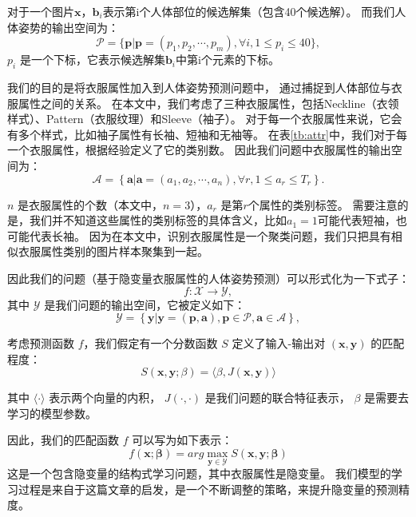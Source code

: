 对于一个图片$\mathbf{x}$，$\mathbf{b}_i$表示第i个人体部位的候选解集（包含40个候选解）。
而我们人体姿势的输出空间为：
\begin{equation}
    \mathcal{P} = \{\mathbf{p}| \mathbf{p}=(p_1,p_2,\cdots,p_m), \forall i, 1\leq p_i \leq 40\},
\end{equation}
$p_i$ 是一个下标，它表示候选解集$\mathbf{b}_i$中第i个元素的下标。

我们的目的是将衣服属性加入到人体姿势预测问题中，
通过捕捉到人体部位与衣服属性之间的关系。
在本文中，我们考虑了三种衣服属性，包括Neckline（衣领样式）、Pattern（衣服纹理）和Sleeve（袖子）。
对于每一个衣服属性来说，它会有多个样式，比如袖子属性有长袖、短袖和无袖等。
在表\ref{tb:attr}中，我们对于每一个衣服属性，根据经验定义了它的类别数。
因此我们问题中衣服属性的输出空间为：
\begin{equation}
    \mathcal{A} = \left\{ \mathbf{a}|\mathbf{a} = (a_1, a_2, \cdots, a_n), \forall r, 1 \leq a_r \leq T_r \right\}.
\end{equation}

$n$ 是衣服属性的个数（本文中，$n = 3$），$a_r$ 是第$r$个属性的类别标签。
需要注意的是，我们并不知道这些属性的类别标签的具体含义，比如$a_1 = 1$可能代表短袖，也可能代表长袖。
因为在本文中，识别衣服属性是一个聚类问题，我们只把具有相似衣服属性类别的图片样本聚集到一起。

因此我们的问题（基于隐变量衣服属性的人体姿势预测）可以形式化为一下式子：
\begin{equation}
    f: \mathcal{X} \rightarrow \mathcal{Y},
    \label{eq:task_func}
\end{equation}
其中 $\mathcal{Y}$ 是我们问题的输出空间，它被定义如下：
\begin{equation}
    \mathcal{Y} = \left\{ \mathbf{y}|\mathbf{y} = (\mathbf{p},\mathbf{a}), \mathbf{p} \in \mathcal{P}, \mathbf{a} \in \mathcal{A} \right\},
\end{equation}

考虑预测函数 $f$，我们假定有一个分数函数 $S$ 定义了输入-输出对 $(\mathbf{x}, \mathbf{y})$ 的匹配程度：
\begin{equation}
\label{eq:map}
    S(\mathbf{x}, \mathbf{y};\beta) = \langle \beta, J(\mathbf{x}, \mathbf{y}) \rangle
\end{equation}

其中 $\langle \cdot \rangle$ 表示两个向量的内积，
$J(\cdot, \cdot)$ 是我们问题的联合特征表示，
$\beta$ 是需要去学习的模型参数。

因此，我们的匹配函数 $f$ 可以写为如下表示：
\begin{equation}
    f(\mathbf{x}; \mathbf{\beta}) = arg \max_{ \mathbf{y} \in \mathcal{Y} } S(\mathbf{x}, \mathbf{y}; \mathbf{\beta})
    \label{eq:score}
\end{equation}
这是一个包含隐变量的结构式学习问题，其中衣服属性是隐变量。
我们模型的学习过程是来自于\cite{dpm}这篇文章的启发，是一个不断调整的策略，来提升隐变量的预测精度。


